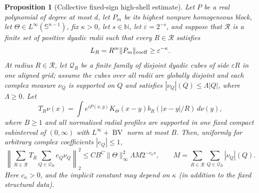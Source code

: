 \documentclass[11pt]{article}
\numberwithin{equation}{section}
\newtheorem{proposition}[theorem]{Proposition}
\theoremstyle{remark}
\theoremstyle{definition}
\newcommand{\Sph}{\mathbb S}
\newcommand{\norm}[1]{\lVert #1\rVert}
\newcommand{\BV}{\operatorname{BV}}
\begin{document}
\begin{proposition}[Collective fixed-sign high-shell estimate]
\label{prop:collective-high}
Let $P$ be a real polynomial of degree at most $d$, let $P_m$ be its
highest nonpure homogeneous block, let
$\Theta\in L^\infty(\Sph^{n-1})$, fix
$\kappa>0$, let $s\in\mathbb N$, let $\varepsilon=2^{-s}$, and suppose
that $\mathcal R$ is a finite set of positive dyadic radii such that every
$R\in\mathcal R$ satisfies
\begin{equation}\label{eq:collective-high-threshold}
 L_R=R^m\norm{P_m}_{\rm coeff}\ge\varepsilon^{-\kappa}.
\end{equation}
At radius $R\in\mathcal R$, let $\mathcal Q_R$ be a finite family of
disjoint dyadic cubes of side $\varepsilon R$ in one aligned grid; assume
the cubes over all radii are globally disjoint and
each complex measure $\nu_Q$ is supported on $Q$ and satisfies
$|\nu_Q|(Q)\le\Lambda|Q|$, where $\Lambda\ge0$.  Let
\[
 T_R\nu(x)=\int e^{iP(x,y)}K_\Theta(x-y)
 b_R(|x-y|/R)\,d\nu(y),
\]
where $B\ge1$ and all normalized radial profiles are supported in one
fixed compact subinterval of $(0,\infty)$ with $L^\infty+\BV$ norm at
most $B$.
Then, uniformly for arbitrary complex coefficients $|e_Q|\le1$,
\begin{equation}\label{eq:collective-high}
 \left\|\sum_{R\in\mathcal R} T_R
       \sum_{Q\in\mathcal Q_R}e_Q\nu_Q\right\|_2^2
 \le CB^C\norm\Theta_\infty^2\Lambda M 2^{-c_\kappa s},
 \qquad M=\sum_{R\in\mathcal R}\sum_{Q\in\mathcal Q_R}|\nu_Q|(Q).
\end{equation}
Here $c_\kappa>0$, and the implicit constant may depend on $\kappa$
(in addition to the fixed structural data).
\end{proposition}
\end{document}
